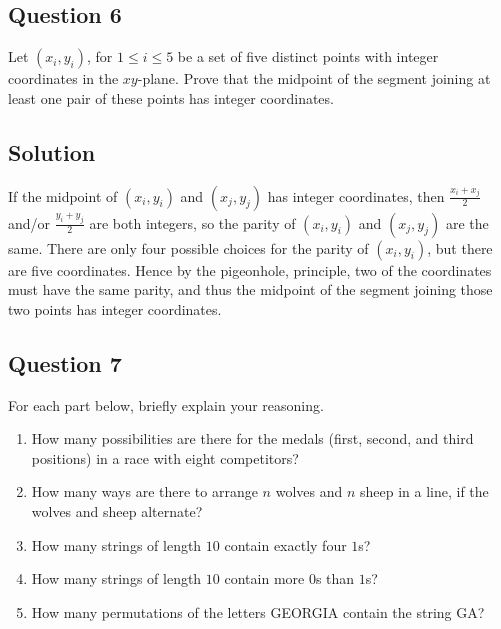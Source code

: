 \documentclass{article}
\begin{document}
\subsection*{Question 6} 
    Let $(x_{i}, y_{i})$, for $1 \le i \le 5$ be a set of five distinct points with integer coordinates in the $xy$-plane. Prove that the midpoint of the segment joining at least one pair of these points has integer coordinates.

\subsection*{Solution}
    If the midpoint of $(x_{i}, y_{i})$ and $(x_{j}, y_{j})$ has integer coordinates, then $\frac{x_{i} + x_{j}}{2}$ and/or $\frac{y_{i} + y_{j}}{2}$ are both integers, so the parity of $(x_{i}, y_{i})$ and $(x_{j}, y_{j})$ are the same. There are only four possible choices for the parity of $(x_{i}, y_{i})$, but there are five coordinates. Hence by the pigeonhole, principle, two of the coordinates must have the same parity, and thus the midpoint of the segment joining those two points has integer coordinates.

\subsection*{Question 7} 
    For each part below, briefly explain your reasoning.
    \begin{enumerate}
        \item How many possibilities are there for the medals (first, second, and third positions) in a race with eight competitors?
        \item How many ways are there to arrange $n$ wolves and $n$ sheep in a line, if the wolves and sheep alternate?
        \item How many strings of length $10$ contain exactly four $1$s?
        \item How many strings of length $10$ contain more $0$s than $1$s?
        \item How many permutations of the letters GEORGIA contain the string GA?
    \end{enumerate}
\end{document}
